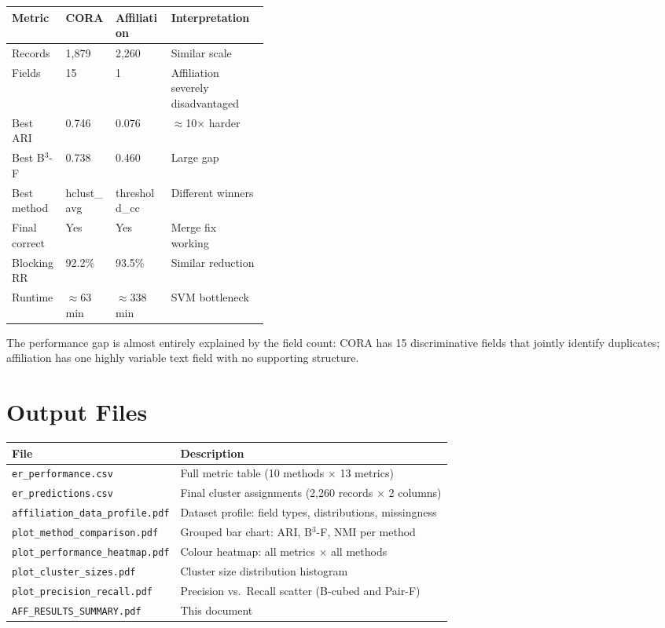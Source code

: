 \documentclass[11pt, a4paper]{article}
\begin{document}
\begin{table}[h!]
\centering
\begin{tabular}{lllp{0.38\linewidth}}
\toprule
\textbf{Metric} & \textbf{CORA} & \textbf{Affiliation} & \textbf{Interpretation} \\
\midrule
Records       & 1,879  & 2,260  & Similar scale \\
Fields        & 15     & 1      & Affiliation severely disadvantaged \\
Best ARI      & 0.746  & 0.076  & $\approx$10$\times$ harder \\
Best B$^3$-F  & 0.738  & 0.460  & Large gap \\
Best method   & hclust\_avg & threshold\_cc & Different winners \\
Final correct & Yes    & Yes    & Merge fix working \\
Blocking RR   & 92.2\% & 93.5\% & Similar reduction \\
Runtime       & $\approx$63 min & $\approx$338 min & SVM bottleneck \\
\bottomrule
\end{tabular}
\end{table}

The performance gap is almost entirely explained by the field count: CORA has 15 discriminative
fields that jointly identify duplicates; affiliation has one highly variable text field with no
supporting structure.

\section{Output Files}

\begin{table}[h!]
\centering
\begin{tabular}{ll}
\toprule
\textbf{File} & \textbf{Description} \\
\midrule
\texttt{er\_performance.csv}           & Full metric table (10 methods $\times$ 13 metrics) \\
\texttt{er\_predictions.csv}           & Final cluster assignments (2,260 records $\times$ 2 columns) \\
\texttt{affiliation\_data\_profile.pdf} & Dataset profile: field types, distributions, missingness \\
\texttt{plot\_method\_comparison.pdf}  & Grouped bar chart: ARI, B$^3$-F, NMI per method \\
\texttt{plot\_performance\_heatmap.pdf} & Colour heatmap: all metrics $\times$ all methods \\
\texttt{plot\_cluster\_sizes.pdf}      & Cluster size distribution histogram \\
\texttt{plot\_precision\_recall.pdf}   & Precision vs.\ Recall scatter (B-cubed and Pair-F) \\
\texttt{AFF\_RESULTS\_SUMMARY.pdf}     & This document \\
\bottomrule
\end{tabular}
\end{table}
\end{document}
